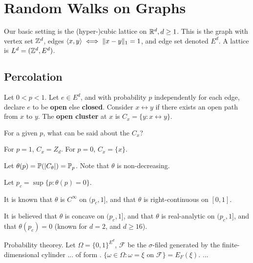 \chapter{Random Walks on Graphs}
\label{cha:random-walks-graphs}

Our basic setting is the (hyper-)cubic lattice on $\mathbb{R}^{d}, d \geq 1$.
This is the graph with vertex set $\mathbb{Z}^{d}$, edges $\IP{x, y} \iff \| x
- y \|_{1} = 1$, and edge set denoted $E^{d}$.  A lattice is $L^{d} =
(\mathbb{Z}^{d}, E^{d})$.

\section{Percolation}
\label{sec:percolation}

Let $0 < p < 1$. Let $e \in E^{d}$, and with probability $p$
independently for each edge, declare $e$ to be \textbf{open} else
\textbf{closed}. Consider $x \leftrightarrow y$ if there exists an
open path from $x$ to $y$. The \textbf{open cluster} at $x$ is $C_{x}
= \{ y: x \leftrightarrow y \}$.

\begin{boxthm}
  For a given $p$, what can be said about the $C_{x}$?
\end{boxthm}

For $p = 1$, $C_{x} = Z_{d}$.  For $p = 0$, $C_{x} = \{ x \}$.

\begin{defn}
  \label{defn:random_walks_on_graphs:1}
  Let $\theta(p) = \Prob{|C_{\theta}|} = \Prob_{p}$. Note that
  $\theta$ is non-decreasing.

  Let $p_{c} = \sup \{ p : \theta(p) = 0 \}$.

  It is known that $\theta$ is $C^{\infty}$ on $(p_{c}, 1]$, and that
  $\theta$ is right-continuous on $[0, 1]$.

  It is believed that $\theta$ is concave on $(p_{c}, 1]$, and that
  $\theta$ is real-analytic on $(p_{c}, 1]$, and that $\theta(p_{c}) =
  0$ (known for $d = 2$, and $d \geq 16$).
\end{defn}

\begin{defn}
  \label{defn:random_walks_on_graphs:2}
  Probability theorey.  Let $\Omega = \{ 0, 1\}^{E^{d}}$,
  $\mathcal{F}$ be the $\sigma$-filed generated by the
  finite-dimensional cylinder ... of form .
  $\{ \omega \in \Omega: \omega = \text{$\xi$ on $\mathcal{F}$}\} =
  E_{F}(\xi)$.
  ...
\end{defn}

